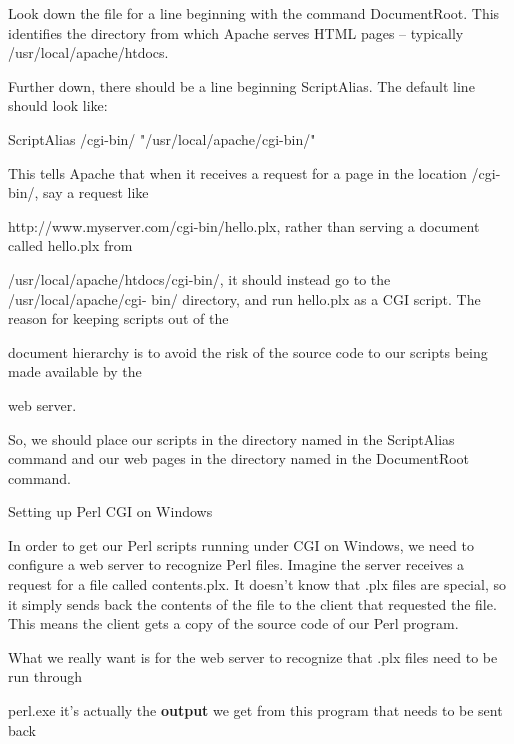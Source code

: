 \documentclass[a4paper,11pt]{book}
\begin{document}
\noindent 

\noindent Look down the file for a line beginning with the command DocumentRoot. This identifies the directory from which Apache serves HTML pages -- typically /usr/local/apache/htdocs.

\noindent 

\noindent Further down, there should be a line beginning ScriptAlias. The default line should look like:

\noindent 

\noindent ScriptAlias /cgi-bin/ "/usr/local/apache/cgi-bin/"

\noindent 

\noindent This tells Apache that when it receives a request for a page in the location /cgi-bin/, say a request like

\noindent http://www.myserver.com/cgi-bin/hello.plx, rather than serving a document called hello.plx from

\noindent /usr/local/apache/htdocs/cgi-bin/, it should instead go to the /usr/local/apache/cgi- bin/ directory, and run hello.plx as a CGI script. The reason for keeping scripts out of the

\noindent document hierarchy is to avoid the risk of the source code to our scripts being made available by the

\noindent web server.

\noindent 

\noindent So, we should place our scripts in the directory named in the ScriptAlias command and our web pages in the directory named in the DocumentRoot command.

\noindent 

\noindent Setting up Perl CGI on Windows

\noindent 

\noindent In order to get our Perl scripts running under CGI on Windows, we need to configure a web server to recognize Perl files. Imagine the server receives a request for a file called contents.plx. It doesn't know that .plx files are special, so it simply sends back the contents of the file to the client that requested the file. This means the client gets a copy of the source code of our Perl program.

\noindent 

\noindent What we really want is for the  web  server  to  recognize  that  .plx files  need  to  be  run through

\noindent perl.exe it's  actually the  \textbf{output  }we  get  from  this  program  that  needs  to  be  sent back
\end{document}
